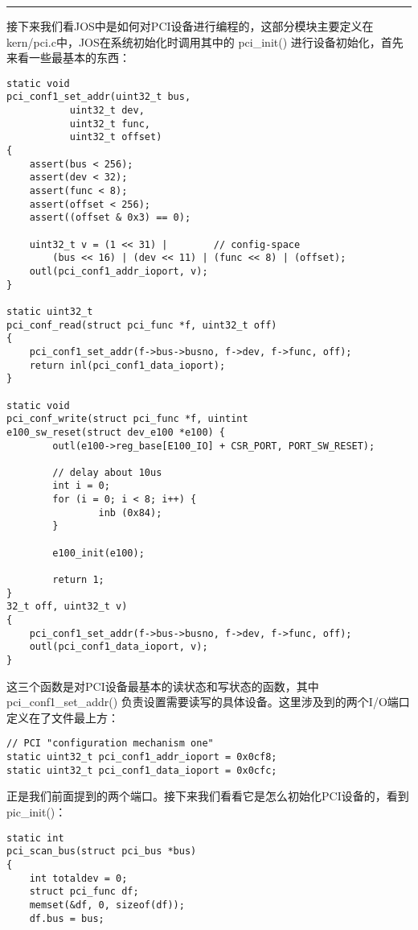 \documentclass{article}
\newcommand{\funcname}[1]{{\ttfamily \small #1}}
\begin{document}
\begin{CJK*}{UTF8}{gkai}
\vspace{2em}
\hrule
\vspace{2em}

接下来我们看JOS中是如何对PCI设备进行编程的，这部分模块主要定义在kern/pci.c中，JOS在系统初始化时调用其中的 \funcname{pci\_init()} 进行设备初始化，首先来看一些最基本的东西：

\begin{lstlisting}[style=ccode, firstnumber=36, title={\scriptsize \ttfamily \bfseries kern/pci.c}]
static void
pci_conf1_set_addr(uint32_t bus,
		   uint32_t dev,
		   uint32_t func,
		   uint32_t offset)
{
	assert(bus < 256);
	assert(dev < 32);
	assert(func < 8);
	assert(offset < 256);
	assert((offset & 0x3) == 0);
	
	uint32_t v = (1 << 31) |		// config-space
		(bus << 16) | (dev << 11) | (func << 8) | (offset);
	outl(pci_conf1_addr_ioport, v);
}

static uint32_t
pci_conf_read(struct pci_func *f, uint32_t off)
{
	pci_conf1_set_addr(f->bus->busno, f->dev, f->func, off);
	return inl(pci_conf1_data_ioport);
}

static void
pci_conf_write(struct pci_func *f, uintint
e100_sw_reset(struct dev_e100 *e100) {
        outl(e100->reg_base[E100_IO] + CSR_PORT, PORT_SW_RESET);
        
        // delay about 10us
        int i = 0;
        for (i = 0; i < 8; i++) {
                inb (0x84);
        }

        e100_init(e100);

        return 1;
}
32_t off, uint32_t v)
{
	pci_conf1_set_addr(f->bus->busno, f->dev, f->func, off);
	outl(pci_conf1_data_ioport, v);
}
\end{lstlisting}


这三个函数是对PCI设备最基本的读状态和写状态的函数，其中 \funcname{ pci\_conf1\_set\_addr() } 负责设置需要读写的具体设备。这里涉及到的两个I/O端口定义在了文件最上方：


\begin{lstlisting}[style=ccode, firstnumber=12, title={\scriptsize \ttfamily \bfseries kern/pci.c}]
// PCI "configuration mechanism one"
static uint32_t pci_conf1_addr_ioport = 0x0cf8;
static uint32_t pci_conf1_data_ioport = 0x0cfc;
\end{lstlisting}

正是我们前面提到的两个端口。接下来我们看看它是怎么初始化PCI设备的，看到 \funcname{pic\_init()}：


\begin{lstlisting}[style=ccode, firstnumber=36, title={\scriptsize \ttfamily \bfseries kern/pci.c}]
static int 
pci_scan_bus(struct pci_bus *bus)
{
    int totaldev = 0;
    struct pci_func df;
    memset(&df, 0, sizeof(df));
    df.bus = bus;
	

\end{lstlisting}
\end{CJK*}
\end{document}
